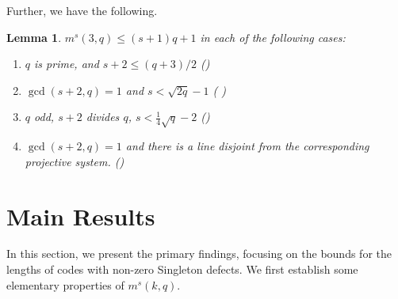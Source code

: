 \documentclass[11pt,a4paper]{amsart}
\theoremstyle{plain}
\newtheorem{lemma}[theorem]{Lemma}
\theoremstyle{definition}
\theoremstyle{remark}
\begin{document}
	Further, we have the following.

	\begin{lemma} \label{lem: s-arcs in the plane}
		$m^s(3,q)\le (s+1)q+1$ in each of the following cases:
		\begin{enumerate}
			\item $q$ is prime, and $s+2\le (q+3)/2$ (\cite{MR1413900}) \label{part: 1, prime case  lem: s-arcs in the plane}
			\item $\gcd(s+2,q)=1$ and $s<\sqrt{2q}-1$  (\cite{MR2158768} ) \label{part: 2, lem: s-arcs in the plane}
			\item $q$ odd, $s+2$ divides $q$, $s<\frac14\sqrt{q}-2$ (\cite{MR2067604}) \label{part: 4, lem: s-arcs in the plane}
			\item $\gcd(s+2,q)=1$ and there is a line disjoint from the corresponding projective system. (\cite{MR1317133}) \label{part: 3, lem: s-arcs in the plane}
		\end{enumerate}
	\end{lemma}

	\section{Main Results}

	In this section, we present the primary findings, focusing on the bounds for the lengths of codes with non-zero Singleton defects. We first establish some elementary properties of $m^s(k,q)$.
\end{document}
